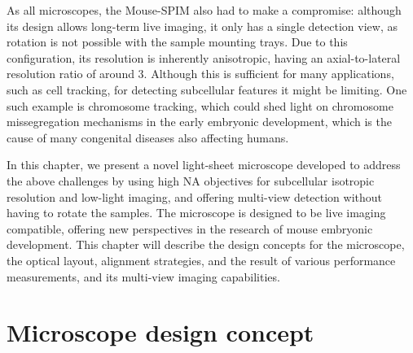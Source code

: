 As all microscopes, the Mouse-SPIM also had to make a compromise: although its design allows long-term live imaging, it only has a single detection view, as rotation is not possible with the sample mounting trays. Due to this configuration, its resolution is inherently anisotropic, having an axial-to-lateral resolution ratio of around 3. Although this is sufficient for many applications, such as cell tracking, for detecting subcellular features it might be limiting. One such example is chromosome tracking, which could shed light on chromosome missegregation mechanisms in the early embryonic development, which is the cause of many congenital diseases also affecting humans.

In this chapter, we present a novel light-sheet microscope developed to address the above challenges by using high NA objectives for subcellular isotropic resolution and low-light imaging, and offering multi-view detection without having to rotate the samples. The microscope is designed to be live imaging compatible, offering new perspectives in the research of mouse embryonic development. This chapter will describe the design concepts for the microscope, the optical layout, alignment strategies, and the result of various performance measurements, and its multi-view imaging capabilities. 


\section{Microscope design concept}
\label{sec:120concept}

